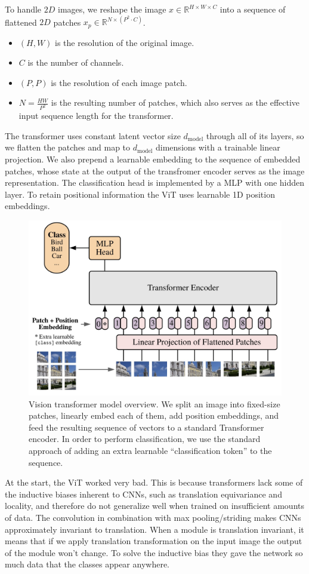 To handle $2D$ images, we reshape the image $x \in \mathbb{R}^{H\times W \times C}$ into a sequence of flattened $2D$ patches $x_p \in \mathbb{R}^{N \times (P^2 \cdot C)}$.
\begin{itemize}
  \item $(H, W)$ is the resolution of the original image.
  \item $C$ is the number of channels.
  \item $(P, P)$ is the resolution of each image patch.
  \item $N = \frac{HW}{P^2}$ is the resulting number of patches, which also serves as the effective input sequence length for the transformer.
\end{itemize}

The transformer uses constant latent vector size $d_{\text{model}}$ through all of its layers, so we flatten the patches and map to $d_{\text{model}}$ dimensions with a trainable linear projection.
We also prepend a learnable embedding to the sequence of embedded patches, whose state at the output of the transfromer encoder serves as the image representation.
The classification head is implemented by a MLP with one hidden layer.
To retain positional information the ViT uses learnable 1D position embeddings.

\begin{figure}[htbp]
  \centering
  \includegraphics[width=0.6\linewidth]{./img/vision_transformer.jpg}
  \caption{Vision transformer model overview. We split an image into fixed-size patches, linearly embed each of them, add position embeddings, and feed the resulting sequence of vectors to a standard Transformer encoder. In order to perform classification, we use the standard approach of adding an extra learnable “classification token” to the sequence.}
\end{figure}

At the start, the ViT worked very bad.
This is because transformers lack some of the inductive biases inherent to CNNs, such as translation equivariance and locality, and therefore do not generalize well when trained on insufficient amounts of data.
The convolution in combination with max pooling/striding makes CNNs approximately invariant to translation.
When a module is translation invariant, it means that if we apply translation transformation on the input image the output of the module won't change.
To solve the inductive bias they gave the network so much data that the classes appear anywhere.

